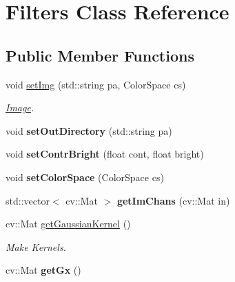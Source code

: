 \hypertarget{classFilters}{}\section{Filters Class Reference}
\label{classFilters}
\subsection*{Public Member Functions}
\begin{DoxyCompactItemize}
\item 
void \hyperlink{classFilters_a6f5b5774525467f08d95f0d6730bd1fd}{set\+Img} (std\+::string pa, Color\+Space cs)\hypertarget{classFilters_a6f5b5774525467f08d95f0d6730bd1fd}{}\label{classFilters_a6f5b5774525467f08d95f0d6730bd1fd}

\begin{DoxyCompactList}\small\item\em \hyperlink{classImage}{Image}. \end{DoxyCompactList}\item 
void {\bfseries set\+Out\+Directory} (std\+::string pa)\hypertarget{classFilters_a096463b2b9f280a5061fe899fd3a9d7d}{}\label{classFilters_a096463b2b9f280a5061fe899fd3a9d7d}

\item 
void {\bfseries set\+Contr\+Bright} (float cont, float bright)\hypertarget{classFilters_a77e100fe8260a41ccde330410ea93209}{}\label{classFilters_a77e100fe8260a41ccde330410ea93209}

\item 
void {\bfseries set\+Color\+Space} (Color\+Space cs)\hypertarget{classFilters_ac71f55e185b1ebbc29a2091132c0c08a}{}\label{classFilters_ac71f55e185b1ebbc29a2091132c0c08a}

\item 
std\+::vector$<$ cv\+::\+Mat $>$ {\bfseries get\+Im\+Chans} (cv\+::\+Mat in)\hypertarget{classFilters_a7248724e2f55b467dbd1db731946f98e}{}\label{classFilters_a7248724e2f55b467dbd1db731946f98e}

\item 
cv\+::\+Mat \hyperlink{classFilters_a57b50d0698fd7602a021e99fdc4c88bb}{get\+Gaussian\+Kernel} ()\hypertarget{classFilters_a57b50d0698fd7602a021e99fdc4c88bb}{}\label{classFilters_a57b50d0698fd7602a021e99fdc4c88bb}

\begin{DoxyCompactList}\small\item\em Make Kernels. \end{DoxyCompactList}\item 
cv\+::\+Mat {\bfseries get\+Gx} ()\hypertarget{classFilters_adebade550c3d0c65a963d8d29f7fc143}{}\label{classFilters_adebade550c3d0c65a963d8d29f7fc143}


\end{DoxyCompactItemize}
